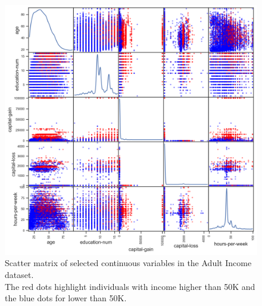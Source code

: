 \documentclass[11pt]{article}
\begin{document}
\newpage
\begin{figure}[h!]
  \centering
  \includegraphics[width=\textwidth]{../scatter_matrix.png}
  \caption{Scatter matrix of selected continuous variables in the Adult Income dataset. \\
            The red dots highlight individuals with income higher than 50K and the blue dots for lower than 50K.}
  \label{fig:scatter}
\end{figure}
\end{document}
